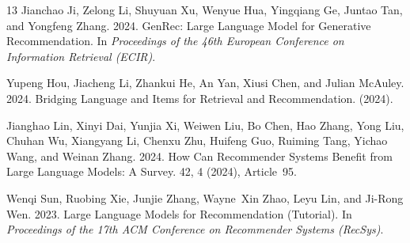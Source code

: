 \documentclass[sigconf,nonacm]{acmart}
\begin{document}
\begin{thebibliography}{13}
Jianchao Ji, Zelong Li, Shuyuan Xu, Wenyue Hua, Yingqiang Ge, Juntao Tan, and Yongfeng Zhang. 2024.
\newblock GenRec: Large Language Model for Generative Recommendation.
\newblock In {\em Proceedings of the 46th European Conference on Information Retrieval (ECIR)}.

Yupeng Hou, Jiacheng Li, Zhankui He, An Yan, Xiusi Chen, and Julian McAuley. 2024.
\newblock Bridging Language and Items for Retrieval and Recommendation.
 (2024).

Jianghao Lin, Xinyi Dai, Yunjia Xi, Weiwen Liu, Bo Chen, Hao Zhang, Yong Liu, Chuhan Wu, Xiangyang Li, Chenxu Zhu, Huifeng Guo, Ruiming Tang, Yichao Wang, and Weinan Zhang. 2024.
\newblock How Can Recommender Systems Benefit from Large Language Models: A Survey.
 42, 4 (2024), Article~95.

Wenqi Sun, Ruobing Xie, Junjie Zhang, Wayne~Xin Zhao, Leyu Lin, and Ji-Rong Wen. 2023.
\newblock Large Language Models for Recommendation (Tutorial).
\newblock In {\em Proceedings of the 17th ACM Conference on Recommender Systems (RecSys)}.

\end{thebibliography}
\end{document}
